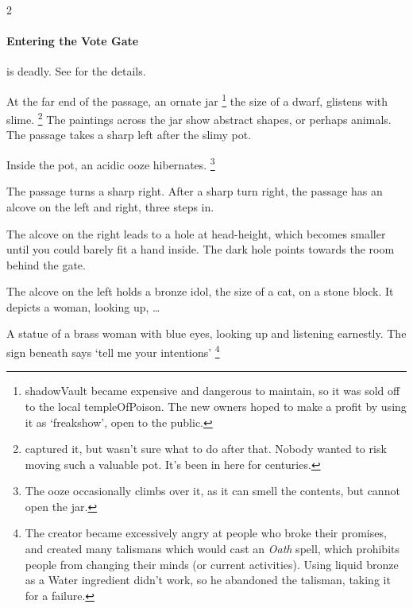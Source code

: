 \begin{multicols}{2}
\showStdSpells[
  \setcounter{diceNo}{0}
]

\paragraph{Entering the Vote Gate}
is deadly.
See  for the details.


\begin{boxtext}
  At the far end of the passage, an ornate jar%
  \footnote{\Gls{shadowVault} became expensive and dangerous to maintain, so it was sold off to the local \gls{templeOfPoison}.
  The new owners hoped to make a profit by using it as  `freakshow', open to the public.}
  the size of a dwarf, glistens with slime.%
  \footnote{ captured it, but wasn't sure what to do after that.
  Nobody wanted to risk moving such a valuable pot.
  It's been in here for centuries.}
  The paintings across the jar show abstract shapes, or perhaps animals.
  The passage takes a sharp left after the slimy pot.
\end{boxtext}

Inside the pot, an acidic ooze hibernates.%
\footnote{The ooze  occasionally climbs over it, as it can smell the contents, but cannot open the jar.}

\jelly[1]


\begin{boxtext}
  The passage turns a sharp right.
  After a sharp turn right, the passage has an alcove on the left and right, three \glspl{step} in.

  The alcove on the right leads to a hole at head-height, which becomes smaller until you could barely fit a hand inside.
  The dark hole points towards the room behind the gate.

  The alcove on the left holds a bronze idol, the size of a cat, on a stone block.
  It depicts a woman, looking up, \ldots
\end{boxtext}

  {A statue of a brass woman with blue eyes, looking up and listening earnestly.
  The sign beneath says `tell me your intentions'%
  \footnote{The creator became excessively angry at people who broke their promises, and created many \glspl{talisman} which would cast an \textit{Oath} \gls{spell}, which prohibits people from changing their minds (or current activities).
  Using liquid bronze as a Water \gls{ingredient} didn't work, so he abandoned the \gls{talisman}, taking it for a failure.

}}
\end{multicols}
